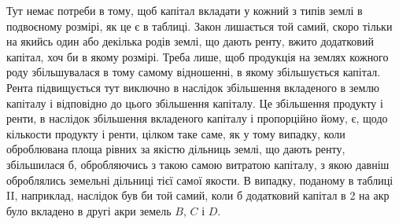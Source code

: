 \noindent{}Тут немає потреби в тому, щоб капітал вкладати у кожний з типів землі
в подвоєному розмірі, як це є в таблиці. Закон лишається той самий, скоро
тільки на якийсь один або декілька родів землі, що дають ренту, вжито додатковий капітал, хоч би в
якому розмірі. Треба лише, щоб продукція на землях
кожного роду збільшувалася в тому самому відношенні, в якому збільшується
капітал. Рента підвищується тут виключно в наслідок збільшення вкладеного
в землю капіталу і відповідно до цього збільшення капіталу. Це збільшення
продукту і ренти, в наслідок збільшення вкладеного капіталу і пропорційно
йому, є,  щодо кількости продукту і ренти, цілком таке саме, як у тому випадку,
коли оброблювана площа рівних за якістю дільниць землі, що дають ренту,
збільшилася б, обробляючись з такою самою витратою капіталу, з якою давніш оброблялись земельні
дільниці тієї самої якости. В випадку, поданому в таблиці II, наприклад, наслідок був би той самий,
коли б додатковий капітал
в 2 на акр було вкладено в другі акри земель $B$, $C$ і $D$.
